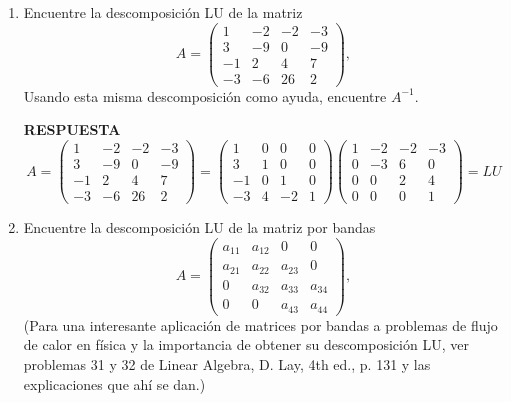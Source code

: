 \documentclass[11pt,letterpaper]{article}
\newcommand{\res}{\textbf{RESPUESTA}\\}
\begin{document}
\begin{enumerate}
\item Encuentre la descomposición LU de la matriz 
\begin{equation*}
A=\left(\begin{array}{rrrr}
 1 & -2 & -2 &-3\\
 3 & -9 &  0 &-9\\
-1 &  2 &  4 & 7\\
-3 & -6 & 26 & 2
\end{array} \right),
\end{equation*}
Usando esta misma descomposición como ayuda, encuentre $A^{-1}$.

\res 
\begin{equation*}
A=\left(\begin{array}{rrrr}
 1 & -2 & -2 &-3\\
 3 & -9 &  0 &-9\\
-1 &  2 &  4 & 7\\
-3 & -6 & 26 & 2
\end{array} \right)=
\left(\begin{array}{rrrr}
 1 &  0 &  0 & 0\\
 3 &  1 &  0 & 0\\
-1 &  0 &  1 & 0\\
-3 &  4 & -2 & 1
\end{array} \right) \left(\begin{array}{rrrr}
 1 & -2 & -2 & -3\\
 0 & -3 &  6 &  0\\
 0 &  0 &  2 &  4\\
 0 &  0 &  0 &  1
\end{array} \right)=LU
\end{equation*}

\item Encuentre la descomposición LU de la matriz por bandas
\begin{equation*}
A=\left(\begin{array}{cccc}
a_{11} & a_{12} &   0    &    0  \\
a_{21} & a_{22} & a_{23} &    0  \\
    0  & a_{32} & a_{33} & a_{34}\\
    0  &   0    & a_{43} & a_{44}
\end{array} \right),
\end{equation*}
(Para una interesante aplicación de matrices por bandas a problemas de flujo de calor en física y la importancia de obtener su descomposición LU, ver problemas 31 y 32 de Linear Algebra, D. Lay, 4th ed., p. 131 y las explicaciones que ahí se dan.)

\end{enumerate}
\end{document}
